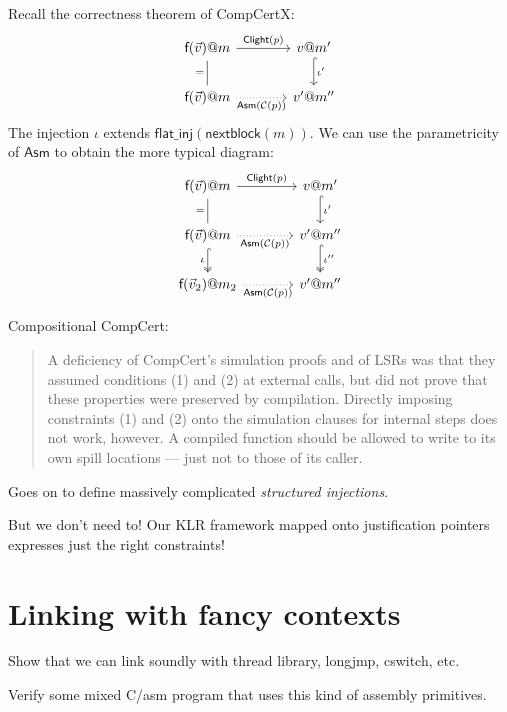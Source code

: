 \documentclass[acmsmall,anonymous]{acmart}
\makeatletter
\newcommand{\kw}[1]{\ensuremath{ \textsf{#1} }}
\newcommand{\mcall}[3]{\kw{#1}({#2})@{#3}}
\newcommand{\mret}[2]{{#1}@{#2}}
\makeatother
\begin{document}
Recall the correctness theorem of CompCertX:
\[
  \begin{tikzcd}[column sep=large]
    \mcall{f}{\vec{v}}{m}
      \arrow[r, "\kw{Clight}(p)"]
      \arrow[d, dash, "="'] &
    \mret{v}{m'}
      \arrow[d, hookrightarrow, "\iota'"] \\
    \mcall{f}{\vec{v}}{m}
      \arrow[r, dotted, "\kw{Asm}(\mathcal{C}(p))"'] &
    \mret{v'}{m''}
  \end{tikzcd}
\]
The injection $\iota$
extends $\kw{flat\_inj}(\kw{nextblock}(m))$.
We can use the parametricity of $\kw{Asm}$
to obtain the more typical diagram:
\[
  \begin{tikzcd}[column sep=large]
    \mcall{f}{\vec{v}}{m}
      \arrow[r, "\kw{Clight}(p)"]
      \arrow[d, dash, "="'] &
    \mret{v}{m'}
      \arrow[d, hookrightarrow, "\iota'"] \\
    \mcall{f}{\vec{v}}{m}
      \arrow[r, dotted, "\kw{Asm}(\mathcal{C}(p))"']
      \arrow[d, hookrightarrow, two heads, "\iota"'] &
    \mret{v'}{m''}
      \arrow[d, hookrightarrow, two heads, "\iota''"] \\
    \mcall{f}{\vec{v}_2}{m_2}
      \arrow[r, dotted, "\kw{Asm}(\mathcal{C}(p))"'] &
    \mret{v'}{m''}
  \end{tikzcd}
\]

Compositional CompCert:
\begin{quote}
A deficiency of CompCert's simulation proofs and of LSRs
was that they assumed conditions (1) and (2) at external calls,
but did not prove that these properties were preserved by compilation.
Directly imposing constraints (1) and (2)
onto the simulation clauses for internal steps does not work, however.
A compiled function should be allowed to
write to its own spill locations ---
just not to those of its caller.
\end{quote}
Goes on to define massively complicated \emph{structured injections}.

But we don't need to!
Our KLR framework
mapped onto justification pointers
expresses just the right constraints!


\newpage
\section{Linking with fancy contexts} %

Show that we can link soundly with thread library, longjmp, cswitch, etc.

Verify some mixed C/asm program that uses this kind of assembly primitives.
\end{document}
